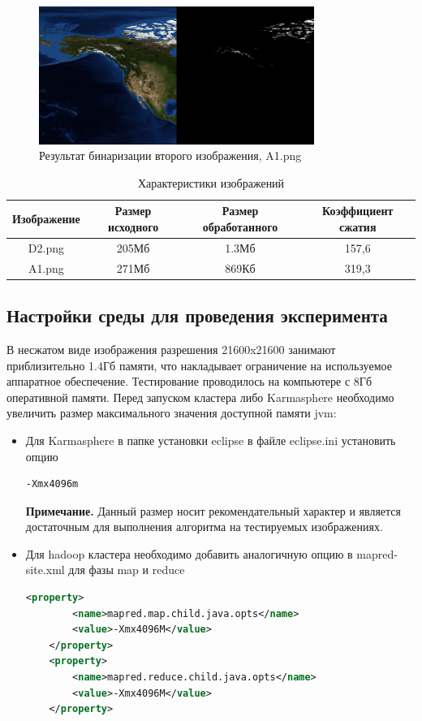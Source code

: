 \documentclass[12pt,a4paper]{extarticle} %
\begin{document}
\begin{figure}[h]
    \centering
    \includegraphics[width=0.8\textwidth]{images/alaska.png}
	\caption{Результат бинаризации второго изображения, A1.png}
\end{figure}

\begin{table}[h]
	\begin{tabular}{|c|c|c|c|}
		Изображение& Размер исходного & Размер обработанного & Коэффициент сжатия\\ \hline
		D2.png&205Мб&1.3Мб&157,6\\
		A1.png&271Мб&869Кб&319,3\\
	\end{tabular}
	\caption{Характеристики изображений}
\end{table}

\subsection{Настройки среды для проведения эксперимента}

	В несжатом виде изображения разрешения 21600x21600 занимают приблизительно 1.4Гб памяти, что накладывает ограничение на используемое аппаратное обеспечение. Тестирование проводилось на компьютере с 8Гб оперативной памяти. Перед запуском кластера либо Karmasphere необходимо увеличить размер максимального значения доступной памяти jvm:
\begin{itemize}
	\item Для Karmasphere в папке установки eclipse в файле eclipse.ini установить опцию 
\begin{lstlisting}[language=sh]
    -Xmx4096m
\end{lstlisting}
	\textbf{Примечание.} Данный размер носит рекомендательный характер и является достаточным для выполнения алгоритма на тестируемых изображениях.
	\item Для hadoop кластера необходимо добавить аналогичную опцию в mapred-site.xml для фазы map и reduce
\begin{lstlisting}[language=xml]
    <property>
        <name>mapred.map.child.java.opts</name>
        <value>-Xmx4096M</value>
    </property>
    <property>
        <name>mapred.reduce.child.java.opts</name>
        <value>-Xmx4096M</value>
    </property>
\end{lstlisting}
\end{itemize}
\end{document}
